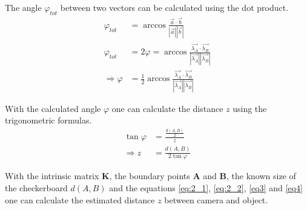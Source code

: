 The angle $\varphi_{tot}$ between two vectors can be calculated using the dot product.
\vspace{-2mm}
{\large %
\begin{align}
    \varphi_{tot} &= \arccos{\frac{\vec{a} \cdot \vec{b}}{|\vec{a}||\vec{b}|}}\nonumber\\[5pt]
    \varphi_{tot} &= 2\varphi = \arccos{\frac{\vec{\lambda_A} \cdot \vec{\lambda_B}}{|\vec{\lambda_A}||\vec{\lambda_B}|}}\nonumber\\[5pt]
    \Rightarrow \varphi &= \frac{1}{2}\arccos{\frac{\vec{\lambda_A} \cdot \vec{\lambda_B}}{|\vec{\lambda_A}||\vec{\lambda_B}|}}\label{eq3}
\end{align}
}

\newpage

With the calculated angle $\varphi$ one can calculate the distance $z$ using the trigonometric formulas. 
{\large
\begin{align}
    \tan{\varphi} &= \frac{\frac{d(A, B)}{2}}{z}\nonumber\\
    \Rightarrow z &= \frac{d(A, B)}{2\tan{\varphi}}\label{eq4}
\end{align}
}

With the intrinsic matrix $\bm{K}$, the boundary points \textbf{A} and \textbf{B}, the known size of the checkerboard $d(A, B)$ and the equations \ref{eq:2_1}, \ref{eq:2_2}, \ref{eq3} and \ref{eq4} one can calculate the estimated distance $z$ between camera and object.





